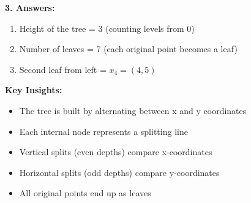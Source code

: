 \textbf{3. Answers:}
\begin{enumerate}[noitemsep]
    \item Height of the tree = 3 (counting levels from 0)
    \item Number of leaves = 7 (each original point becomes a leaf)
    \item Second leaf from left = $x_4 = (4,5)$
\end{enumerate}

\textbf{Key Insights:}
\begin{itemize}[noitemsep]
    \item The tree is built by alternating between x and y coordinates
    \item Each internal node represents a splitting line
    \item Vertical splits (even depths) compare x-coordinates
    \item Horizontal splits (odd depths) compare y-coordinates
    \item All original points end up as leaves
\end{itemize}
